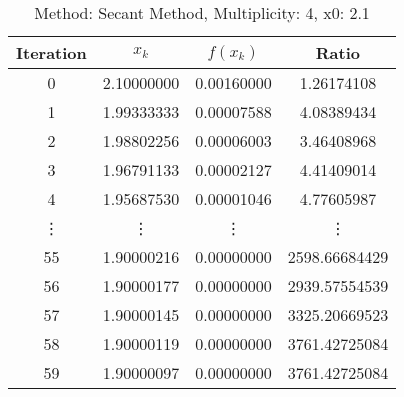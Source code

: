 \begin{table}
\centering
\caption{Method: Secant Method, Multiplicity: 4, x0: 2.1}
\label{tab:table_Secant_Method_4_2_1}
\begin{tabular}{c c c c}
\toprule
Iteration &      $x_k$ &   $f(x_k)$ &         Ratio \\
\midrule
        0 & 2.10000000 & 0.00160000 &    1.26174108 \\
        1 & 1.99333333 & 0.00007588 &    4.08389434 \\
        2 & 1.98802256 & 0.00006003 &    3.46408968 \\
        3 & 1.96791133 & 0.00002127 &    4.41409014 \\
        4 & 1.95687530 & 0.00001046 &    4.77605987 \\
   \vdots &     \vdots &     \vdots &        \vdots \\
       55 & 1.90000216 & 0.00000000 & 2598.66684429 \\
       56 & 1.90000177 & 0.00000000 & 2939.57554539 \\
       57 & 1.90000145 & 0.00000000 & 3325.20669523 \\
       58 & 1.90000119 & 0.00000000 & 3761.42725084 \\
       59 & 1.90000097 & 0.00000000 & 3761.42725084 \\
\bottomrule
\end{tabular}
\end{table}
